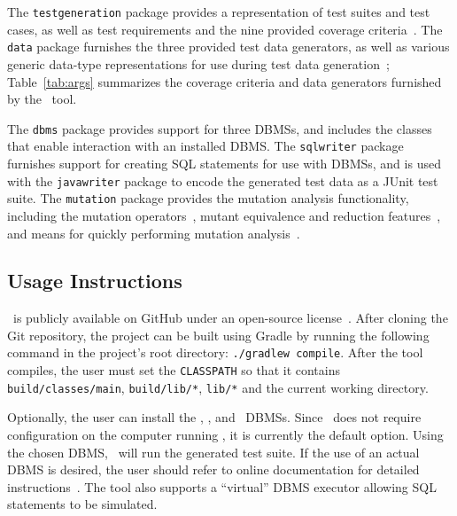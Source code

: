 The \texttt{testgeneration} package provides a representation of test suites and test cases, as well as test
requirements and the nine provided coverage criteria~\cite{mcminn2015effectiveness}.  The \texttt{data} package
furnishes the three provided test data generators, as well as various generic data-type representations for use during
test data generation~\cite{mcminn2015effectiveness}; Table~\ref{tab:args} summarizes the coverage criteria and data
generators furnished by the \sa~tool.


The \texttt{dbms} package provides support for three DBMSs, and includes the classes that enable interaction with an
installed DBMS\@. The \texttt{sqlwriter} package furnishes support for creating SQL statements for use with DBMSs, and is
used with the \texttt{javawriter} package to encode the generated test data as a JUnit test suite.  The
\texttt{mutation} package provides the mutation analysis functionality, including the mutation
operators~\cite{wright2015mutation}, mutant equivalence and reduction features~\cite{wright2014impact}, and means for
quickly performing mutation analysis~\cite{mcminn2016virtual}.

\subsection{Usage Instructions}



\sa~is publicly available on GitHub under an open-source license~\cite{tool}.
After cloning the Git repository, the project can be built using Gradle by
running the following command in the project's root directory:
\lstinline{./gradlew compile}. After the tool compiles, the user must set the
\lstinline{CLASSPATH} so that it contains \lstinline{build/classes/main},
\lstinline{build/lib/*}, \lstinline{lib/*} and the current working directory.



Optionally, the user can install the \postgres, \sqlite, and \hypersql~DBMSs. Since \sqlite~does not require
configuration on the computer running \sa, it is currently the default option. Using the chosen DBMS, \sa~will run the
generated test suite. If the use of an actual DBMS is desired, the user should refer to online documentation for detailed
instructions~\cite{tool}. The tool also supports a ``virtual'' DBMS executor allowing SQL statements to be simulated.

